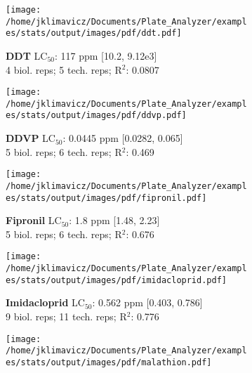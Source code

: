 \documentclass{article}
\begin{document}
\begin{figure}[thp!]
   \begin{subfigure}{0.500\textwidth}
      \centering
      \texttt{[image: /home/jklimavicz/Documents/Plate\_Analyzer/examples/stats/output/images/pdf/ddt.pdf]}
      \vspace{-0.05cm}
      \caption*{\textbf{DDT} LC$_{50}$: 117 ppm [10.2, 9.12e3] \\ 
4 biol. reps; 5 tech. reps; R$^2$: 0.0807}
      \vspace{0.1cm}
   \end{subfigure}%
   \begin{subfigure}{0.500\textwidth}
      \centering
      \texttt{[image: /home/jklimavicz/Documents/Plate\_Analyzer/examples/stats/output/images/pdf/ddvp.pdf]}
      \vspace{-0.05cm}
      \caption*{\textbf{DDVP} LC$_{50}$: 0.0445 ppm [0.0282, 0.065] \\ 
5 biol. reps; 6 tech. reps; R$^2$: 0.469}
      \vspace{0.1cm}
   \end{subfigure}%
\vspace{-0.1cm}
   \begin{subfigure}{0.500\textwidth}
      \centering
      \texttt{[image: /home/jklimavicz/Documents/Plate\_Analyzer/examples/stats/output/images/pdf/fipronil.pdf]}
      \vspace{-0.05cm}
      \caption*{\textbf{Fipronil} LC$_{50}$: 1.8 ppm [1.48, 2.23] \\ 
5 biol. reps; 6 tech. reps; R$^2$: 0.676}
      \vspace{0.1cm}
   \end{subfigure}%
   \begin{subfigure}{0.500\textwidth}
      \centering
      \texttt{[image: /home/jklimavicz/Documents/Plate\_Analyzer/examples/stats/output/images/pdf/imidacloprid.pdf]}
      \vspace{-0.05cm}
      \caption*{\textbf{Imidacloprid} LC$_{50}$: 0.562 ppm [0.403, 0.786] \\ 
9 biol. reps; 11 tech. reps; R$^2$: 0.776}
      \vspace{0.1cm}
   \end{subfigure}%
\vspace{-0.1cm}
   \begin{subfigure}{0.500\textwidth}
      \centering
      \texttt{[image: /home/jklimavicz/Documents/Plate\_Analyzer/examples/stats/output/images/pdf/malathion.pdf]}

\end{subfigure}
\end{figure}
\end{document}
